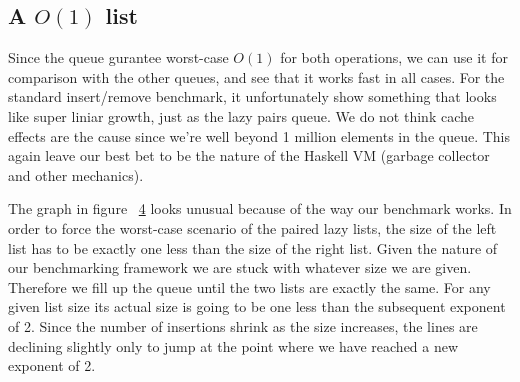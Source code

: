 \subsection*{A $O(1)$ list}
Since the queue gurantee worst-case $O(1)$ for both operations, we can use it for comparison with the other queues, and see that it works fast in all cases. For the standard insert/remove benchmark, it unfortunately show something that looks like super liniar growth, just as the lazy pairs queue. We do not think cache effects are the cause since we're well beyond 1 million elements in the queue. This again leave our best bet to be the nature of the Haskell VM (garbage collector and other mechanics).


\begin{figure}[htb]
\centering

\caption{}
\label{fig:simple}
\end{figure}

\begin{figure}[htb]
\centering

\caption{}
\label{fig:simple-high}
\end{figure}


\begin{figure}[htb]
\centering

\caption{}
\label{fig:reuse-remove-2}
\end{figure}

The graph in figure ~\ref{fig:reuse-remove-4} looks unusual because of the way our benchmark works. In order to force the worst-case scenario of the paired lazy lists, the size of the left list has to be exactly one less than the size of the right list. Given the nature of our benchmarking framework we are stuck with whatever size we are given. Therefore we fill up the queue until the two lists are exactly the same. For any given list size its actual size is going to be one less than the subsequent exponent of 2. Since the number of insertions shrink as the size increases, the lines are declining slightly only to jump at the point where we have reached a new exponent of 2.


\begin{figure}[htb]
\centering

\caption{}
\label{fig:reuse-remove-4}
\end{figure}

